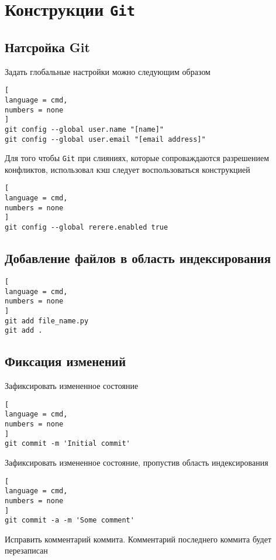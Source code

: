 \documentclass[%
	11pt,
	a4paper,
	utf8,
		]{article}
\begin{document}
\section{Конструкции \texttt{Git}}

\subsection{Натсройка Git}

Задать глобальные настройки можно следующим образом

\begin{lstlisting}[
language = cmd,
numbers = none
]
git config --global user.name "[name]"
git config --global user.email "[email address]"
\end{lstlisting}

Для того чтобы \texttt{Git} при слияниях, которые сопроваждаются разрешением конфликтов, использовал кэш следует воспользоваться конструкцией

\begin{lstlisting}[
language = cmd,
numbers = none
]
git config --global rerere.enabled true
\end{lstlisting}


\subsection{Добавление файлов в область индексирования}

\begin{lstlisting}[
language = cmd,
numbers = none
]
git add file_name.py
git add .
\end{lstlisting}


\subsection{Фиксация изменений}

Зафиксировать измененное состояние

\begin{lstlisting}[
language = cmd,
numbers = none
]
git commit -m 'Initial commit'
\end{lstlisting}

Зафиксировать измененное состояние, пропустив область индексирования

\begin{lstlisting}[
language = cmd,
numbers = none
]
git commit -a -m 'Some comment'
\end{lstlisting}

Исправить комментарий коммита. Комментарий последнего коммита будет перезаписан
\end{document}
